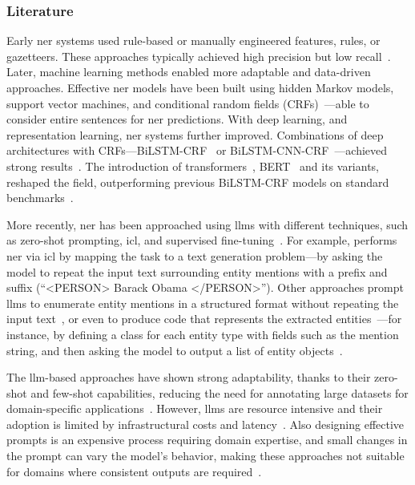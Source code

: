 \subsubsection{Literature}
Early \ac{ner} systems used rule-based or manually engineered features, rules, or gazetteers. These approaches typically achieved high precision but low recall~\cite{keraghel2024recentadvancesnamedentity}.
Later, machine learning methods enabled more adaptable and data-driven approaches. Effective \ac{ner} models have been built using hidden Markov models, support vector machines, and conditional random fields (CRFs)~\cite{keraghel2024recentadvancesnamedentity}---able to consider entire sentences for \ac{ner} predictions.
With deep learning, and representation learning, \ac{ner} systems further improved. Combinations of deep architectures with CRFs---\eg BiLSTM-CRF~\cite{riedl-pado-2018-named,schweter-baiter-2019-towards} or BiLSTM-CNN-CRF~\cite{ma-hovy-2016-end}---achieved strong results~\cite{keraghel2024recentadvancesnamedentity}. The introduction of transformers~\cite{vaswani_transformers_2017}, BERT~\cite{devlin-etal-2019-bert} and its variants, reshaped the field, outperforming previous BiLSTM-CRF models on standard benchmarks~\cite{keraghel2024recentadvancesnamedentity}.




More recently, \ac{ner} has been approached using \aclp{llm} with different techniques, such as zero-shot prompting, \acf{icl}, and supervised fine-tuning~\cite{xu2024llm_for_ie}. For example, \textcite{wang-etal-2025-gptner} performs \ac{ner} via \ac{icl} by mapping the task to a text generation problem---\ie by asking the model to repeat the input text surrounding entity mentions with a prefix and suffix (\eg ``<PERSON> Barack Obama </PERSON>''). Other approaches prompt \acp{llm} to enumerate entity mentions in a structured format without repeating the input text~\cite{xie-etal-2024-self}, or even to produce code that represents the extracted entities~\cite{sainz2024gollie,li-etal-2023-codeie}---for instance, by defining a class for each entity type with fields such as the mention string, and then asking the model to output a list of entity objects~\cite{sainz2024gollie}.

The \ac{llm}-based approaches have shown strong adaptability, thanks to their zero-shot and few-shot capabilities, reducing the need for annotating large datasets for domain-specific applications~\cite{keraghel2024recentadvancesnamedentity}. However, \acp{llm} are resource intensive and their adoption is limited by infrastructural costs and latency~\cite{keraghel2024recentadvancesnamedentity}. Also designing effective prompts is an expensive process requiring domain expertise, and small changes in the prompt can vary the model's behavior, making these approaches not suitable for domains where consistent outputs are required~\cite{keraghel2024recentadvancesnamedentity}. 

